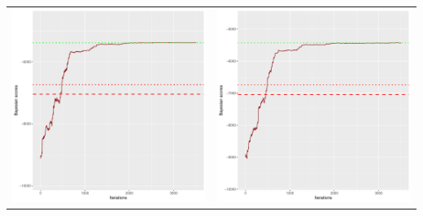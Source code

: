 \documentclass[]{scrartcl}
\begin{document}
\begin{table}[h!]
\begin{tabular}{cc}
\includegraphics[scale = 0.4]{./figs/alarm/v2/30/bayBoundsEvolution-3502.pdf} & 
\includegraphics[scale = 0.4]{./figs/alarm/v2/50/bayBoundsEvolution-3502.pdf} \\

\end{tabular}
\end{table}
\end{document}

